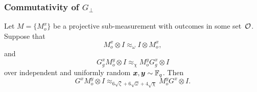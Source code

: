 \subsubsection{Commutativity of $G_{\perp}$}

\begin{lemma}\label{lem:commutativity-switcheroo}
Let $M = \{M^x_o\}$ be a projective sub-measurement with outcomes in some set~$\mathcal{O}$.
Suppose that
\begin{equation}\label{eq:M-self-consistent}
M^x_o \otimes I \approx_{\omega} I \otimes M^x_o,
\end{equation}
and
\begin{equation}\label{eq:M-commutes-with-G}
G^x_g M^y_o \otimes I \approx_{\chi} M^y_o G^x_g \otimes I
\end{equation}
over independent and uniformly random ${\boldsymbol{x}}, \boldsymbol{y} \sim \mathbb F_q$. Then
\begin{equation*}
G^x M^y_o \otimes I \approx_{6\sqrt{\zeta} + 6\sqrt{\omega} + 4\sqrt{\chi}} M^y_o G^x \otimes I.
\end{equation*}
\end{lemma}
